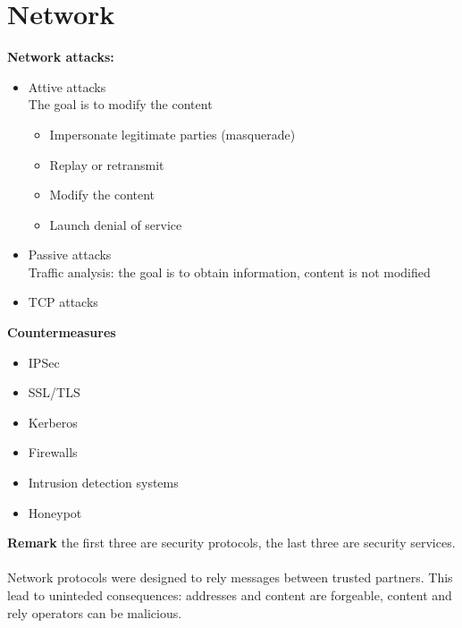 \documentclass[10pt,a4paper]{book}
\begin{document}
\section{Network}
\textbf{Network attacks:}
\begin{itemize}
\item Attive attacks\\
The goal is to modify the content
\begin{itemize}
\item Impersonate legitimate parties (masquerade)
\item Replay or retransmit
\item Modify the content
\item Launch denial of service
\end{itemize}
\item Passive attacks\\
Traffic analysis: the goal is to obtain information, content is not modified
\item TCP attacks
\end{itemize}
\textbf{Countermeasures}
\begin{itemize}
\item IPSec
\item SSL/TLS
\item Kerberos
\item Firewalls
\item Intrusion detection systems
\item Honeypot
\end{itemize}
\textbf{Remark} the first three are security protocols, the last three are security services.\\\\
Network protocols were designed to rely messages between trusted partners. This lead to uninteded consequences: addresses and content are forgeable, content and rely operators can be malicious.
\end{document}
